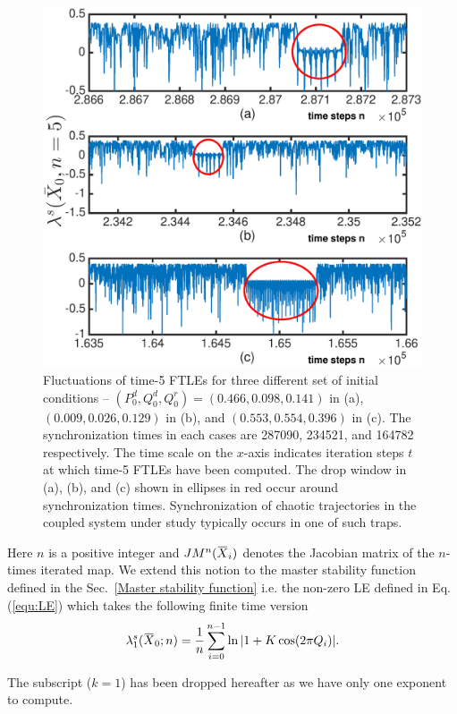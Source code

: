 \documentclass[reprint,amsmath,amssymb,aps,pre]{revtex4-1}
\newcommand{\overbar}[1]{\mkern 1.5mu\overline{\mkern-1.5mu#1\mkern-1.5mu}\mkern 1.5mu}
\begin{document}
\begin{figure}[t!]
	\includegraphics[scale=0.41]{FTLE_plots}
	\caption{\label{fig:FTLE}\footnotesize Fluctuations of time-5 FTLEs for three different set of initial conditions -- $(P^d_0,Q^d_0,Q^r_0) = (0.466,0.098,0.141)$ in (a),  $(0.009,0.026,0.129)$ in (b), and $(0.553,0.554,0.396)$ in (c). The synchronization times in each cases are 287090, 234521, and 164782 respectively. The time scale on the $x$-axis indicates iteration steps $t$ at which time-5 FTLEs have been computed. The drop window in (a), (b), and (c) shown in ellipses in red occur around synchronization times. Synchronization of chaotic trajectories in the coupled system under study typically occurs in one of such traps.}
\end{figure}

Here $n$ is a positive integer and $JM^n(\overbar{X}_i)$ denotes the Jacobian matrix of the $n$-times iterated map. We extend this notion to the master stability function defined in the Sec.~\ref{Master stability function}  i.e.  the non-zero LE defined in Eq.(\ref{equ:LE}) 
which takes the following finite time version 
\begin{equation}
\lambda_1^s(\overbar{X}_0;n) = \frac{1}{n}\sum^{n-1}_{i=0}\ln|1 + K \cos (2\pi 
Q_i)|.
\end{equation}

The subscript ($k = 1$) has been dropped hereafter as we have only one 
exponent to compute.
\end{document}
